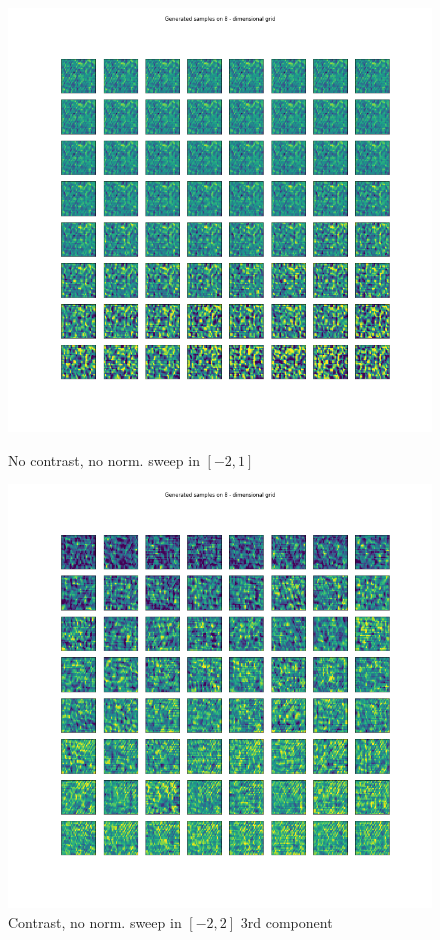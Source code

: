 \documentclass[12pt, english]{article}
\begin{document}
\begin{figure}[H] 
  \label{fig:contrast-correlation} 
  \begin{minipage}{0.33\linewidth}
    \centering
    \includegraphics[width=.72\linewidth]{sweep/no_norm_no_contrast_sweep_minus_two_to_one.png} 
    \caption{No contrast, no \newline norm. sweep in $[-2, 1]$} 
    \label{fig:no-contrast-no-norm-sweep}
  \end{minipage}%
  \begin{minipage}{0.33\linewidth}
    \centering
    \includegraphics[width=.72\linewidth]{sweep/no_norm_contrast_sweep_minus_two_to_two_3rd_param.png} 
    \caption{Contrast, no norm. \newline sweep in $[-2, 2]$ $3$rd component} 
    \label{fig:contrast-no-norm-sweep-3}

\end{minipage}
\end{figure}
\end{document}
